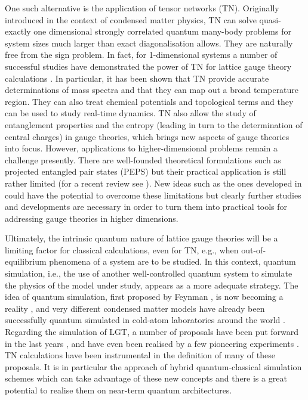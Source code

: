 \documentclass[epj,final]{svjour}
\begin{document}
One such alternative is the application of tensor networks (TN). Originally introduced in the context of condensed matter physics, TN can solve quasi-exactly one dimensional strongly correlated quantum many-body problems for system sizes much larger than exact diagonalisation allows. They are naturally free from the sign problem. In fact, for 1-dimensional systems a number of successful studies have demonstrated the power of TN for lattice gauge theory calculations \cite{banuls2018tensor}. In particular, it has been shown that TN provide accurate determinations of mass spectra and that they can map out a broad temperature region. They can also treat chemical potentials and topological terms and they can be used to study real-time dynamics. TN also allow the study of entanglement properties and the entropy (leading in turn to the determination of central charges) in gauge theories, which brings new aspects of gauge theories into focus. However, applications to higher-dimensional problems remain a challenge presently. There are well-founded theoretical formulations such as projected entangled pair states (PEPS) but their practical application is still rather limited (for a recent review see \cite{RTP19}). New ideas such as the ones developed in \cite{Zohar:2017yxl} could have the potential to overcome these limitations but clearly further studies and developments are necessary in order to turn them into practical tools for addressing gauge theories in higher 
dimensions. 

Ultimately, the intrinsic quantum nature of lattice gauge theories will be a limiting factor for classical calculations, even for TN, e.g., when out-of-equilibrium phenomena of a system are to be studied. In this context, quantum simulation, i.e., the use of another well-controlled quantum system to simulate the physics of the model under study, appears as a more adequate strategy. The idea of quantum simulation, first proposed by Feynman \cite{feynman1982simulating}, is now becoming a reality \cite{Jaksch2005,Bloch2012,blatt2012quantum,Cirac2012}, and very different condensed matter models have already been successfully quantum simulated in cold-atom laboratories around the world \cite{Greif1236362,51atom,entanglement}. Regarding the simulation of LGT, a number of proposals have been put forward in the last years \cite{zohar2012simulating,tagliacozzo2013optical,banerjee2012atomic,zohar2013cold,tagliacozzo2013simulation,banerjee2013atomic,mezzacapo2015non,Wiese:2013uua,zohar2015quantum}, and have even been realised by a few pioneering experiments \cite{martinez2016real}. TN calculations have been instrumental in the definition of many of these proposals. It is in particular the approach of hybrid quantum-classical simulation schemes which can take advantage of these new concepts and there is a great potential to realise them on near-term quantum architectures.
\end{document}

